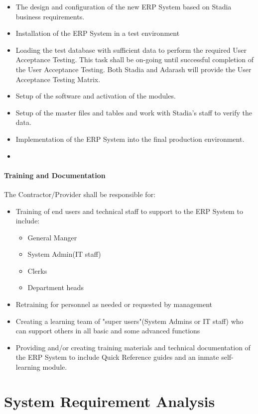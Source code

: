 \begin{itemize}
	\item The design and configuration of the new ERP System based on Stadia business requirements.
	\item Installation of the ERP System in a test environment
	\item Loading the test database with sufficient data to perform the required User Acceptance Testing. This task shall be on-going until successful completion of the User Acceptance Testing. Both Stadia and Adarash will provide the User Acceptance Testing Matrix.
	\item Setup of the software and activation of the modules.
	\item Setup of the master files and tables and work with Stadia's staff to verify the data.
	\item Implementation of the ERP System into the final production environment.
	\item 
\end{itemize}

\paragraph{Training and Documentation}
The Contractor/Provider shall be responsible for:

\begin{itemize}
	\item Training of end users and technical staff to support to the ERP System to include:
		\begin{itemize}
			\item General Manger
			\item System Admin(IT staff)
			\item Clerks
			\item Department heads
		\end{itemize}
	\item Retraining for personnel as needed or requested by management
	\item Creating a learning team of "super users"(System Admins or IT staff) who can support others in all basic and some advanced functions
	\item Providing and/or creating training materials and technical documentation of the ERP System to include Quick Reference guides and an inmate self-learning module.
\end{itemize}

\section{System Requirement Analysis}


